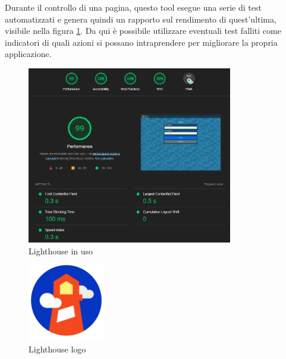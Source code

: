 Durante il controllo di una pagina, questo tool esegue una serie di test automatizzati e genera quindi un rapporto sul rendimento di quest'ultima, visibile nella figura \ref{fig:lighthouseReport}. Da qui è possibile utilizzare eventuali test falliti come indicatori di quali azioni si possano intraprendere per migliorare la propria applicazione.

\begin{figure}[H]
\centering
\includegraphics[width=0.8\textwidth]{img/screen/lighthouse_usage.png}
\caption{Lighthouse in uso}
\label{fig:lighthouseReport}
\end{figure}

\begin{figure}[H]
\centering
\includegraphics[width=0.3\textwidth]{img/logos/lighthouse_logo.png}
\caption{Lighthouse logo}
\label{fig:lighthouseLogo}
\end{figure}
